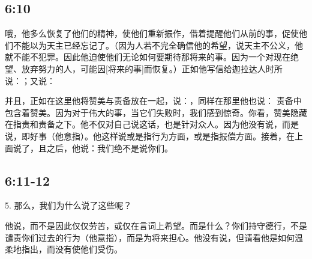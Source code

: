 
\subsection{ 6:10}

哦，他多么恢复了他们的精神，使他们重新振作，借着提醒他们从前的事，促使他们不能以为天主已经忘记了。（因为人若不完全确信他的希望，说天主不公义，他就不能不犯罪。因此他迫使他们无论如何要期待那将来的事。因为一个对现在绝望、放弃努力的人，可能因[将来的事]而恢复。）正如他写信给迦拉达人时所说：；又说：\par

并且，正如在这里他将赞美与责备放在一起，说：，同样在那里他也说： 责备中包含着赞美。因为对于伟大的事，当它们失败时，我们感到惊奇。你看，赞美隐藏在指责和责备之下。他不仅对自己说这话，也是针对众人。因为他没有说，而是说，即好事（他意指）。他这样说或是指行为方面，或是指报偿方面。接着，在上面说了，且之后，他说：我们绝不是说你们。\par


\subsection{ 6:11-12}

5. 那么，我们为什么说了这些呢？\par

他说，而不是因此仅仅劳苦，或仅在言词上希望。而是什么？你们持守德行，不是谴责你们过去的行为（他意指），而是为将来担心。他没有说，但请看他是如何温柔地指出，而没有使他们受伤。\par

